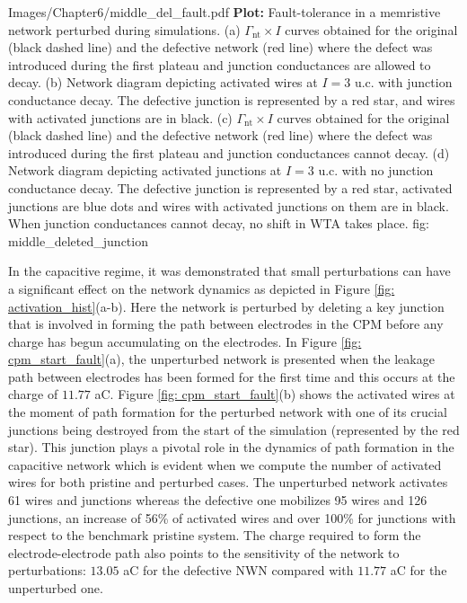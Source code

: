 {Images/Chapter6/middle_del_fault.pdf}
{\textbf{Plot:} Fault-tolerance in a memristive network perturbed during simulations.}
{(a) $\Gamma_{\textrm{nt}} \times I$ curves obtained for the original (black dashed line) and the defective network (red line) where the defect was introduced during the first plateau and junction conductances are allowed to decay. (b) Network diagram depicting activated wires at $I = 3$ u.c. with junction conductance decay. The defective junction is represented by a red star, and wires with activated junctions are in black. (c) $\Gamma_{\textrm{nt}} \times I$ curves obtained for the original (black dashed line) and the defective network (red line) where the defect was introduced during the first plateau and junction conductances cannot decay. (d) Network diagram depicting activated junctions at $I = 3$ u.c. with no junction conductance decay. The defective junction is represented by a red star, activated junctions are blue dots and wires with activated junctions on them are in black. When junction conductances cannot decay, no shift in WTA takes place.}
{fig: middle_deleted_junction}

In the capacitive regime, it was demonstrated that small perturbations can have a significant effect on the network dynamics as depicted in Figure \ref{fig: activation_hist}(a-b). Here the network is perturbed by deleting a key junction that is involved in forming the path between electrodes in the CPM before any charge has begun accumulating on the electrodes. In Figure \ref{fig: cpm_start_fault}(a), the unperturbed network is presented when the leakage path between electrodes has been formed for the first time and this occurs at the charge of $11.77$ aC. Figure \ref{fig: cpm_start_fault}(b) shows the activated wires at the moment of path formation for the perturbed network with one of its crucial junctions being destroyed from the start of the simulation (represented by the red star). This junction plays a pivotal role in the dynamics of path formation in the capacitive network which is evident when we compute the number of activated wires for both pristine and perturbed cases. The unperturbed network activates 61 wires and junctions whereas the defective one mobilizes 95 wires and 126 junctions, an increase of 56\% of activated wires and over 100\% for junctions with respect to the benchmark pristine system. The charge required to form the electrode-electrode path also points to the sensitivity of the network to perturbations: $13.05$ aC for the defective NWN compared with $11.77$ aC for the unperturbed one. 

